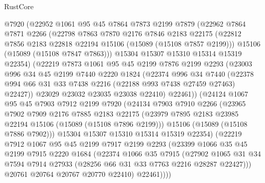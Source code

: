 \begin{lexlean}{RustCore}
\begin{coremodule}
        @7920
        (@22952
          @1061
          @95
          @45
          @7864
          @7873
          @2199
          @7879
          (@22962
            @7864
            @7871
            @2266
            (@22798
              @7863
              @7870
              @2176
              @7846
              @2183
              @22175
              (@22812 @7856 @2183 @22818 @22194 @15106 (@15089 (@15108 @7857 @2199)))
              @15106
              (@15089 (@15108 @7847 @7863)))
            @15304
            @15307
            @15310
            @15314
            @15319
            @22354)
          (@22219
            @7873
            @1061
            @95
            @45
            @2199
            @7876
            @2199
            @2293
            (@23003
              @996
              @34
              @45
              @2199
              @7440
              @2220
              @1824
              (@22374
                @996
                @34
                @7440
                (@22378 @994 @66 @31 @33 @7438 @2216 (@22188 @993 @7438 @27459 @27463) @22427))
              @23029
              @23032
              @23035
              @23038
              @22410)
            @22461))
        (@24124
          @1067
          @95
          @45
          @7903
          @7912
          @2199
          @7920
          (@24134
            @7903
            @7910
            @2266
            (@23965
              @7902
              @7909
              @2176
              @7885
              @2183
              @22175
              (@23979 @7895 @2183 @23985 @22194 @15106 (@15089 (@15108 @7896 @2199)))
              @15106
              (@15089 (@15108 @7886 @7902)))
            @15304
            @15307
            @15310
            @15314
            @15319
            @22354)
          (@22219
            @7912
            @1067
            @95
            @45
            @2199
            @7917
            @2199
            @2293
            (@23399
              @1066
              @35
              @45
              @2199
              @7915
              @2220
              @1684
              (@22374
                @1066
                @35
                @7915
                (@27902
                  @1065
                  @31
                  @34
                  @7594
                  @7914
                  @27933
                  (@28256 @66 @31 @33 @7763 @2216 @28287 @22427)))
              @20761
              @20764
              @20767
              @20770
              @22410)
            @22461))))

\end{coremodule}
\end{lexlean}
